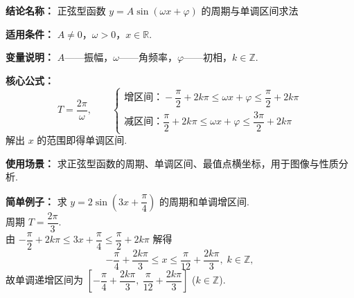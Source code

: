 \textbf{结论名称：} 正弦型函数 $y=A\sin(\omega x+\varphi)$ 的周期与单调区间求法

\textbf{适用条件：} $A\neq0$，$\omega>0$，$x\in\mathbb{R}$.

\textbf{变量说明：} $A$——振幅，$\omega$——角频率，$\varphi$——初相，$k\in\mathbb{Z}$.

\textbf{核心公式：}
\[
\boxed{T = \frac{2\pi}{\omega},\qquad 
\begin{cases}
\text{增区间：} -\dfrac{\pi}{2}+2k\pi \le \omega x+\varphi \le \dfrac{\pi}{2}+2k\pi \\[6pt]
\text{减区间：} \dfrac{\pi}{2}+2k\pi \le \omega x+\varphi \le \dfrac{3\pi}{2}+2k\pi
\end{cases}}
\]
解出 $x$ 的范围即得单调区间.

\textbf{使用场景：} 求正弦型函数的周期、单调区间、最值点横坐标，用于图像与性质分析.

\textbf{简单例子：} 求 $y=2\sin\!\left(3x+\dfrac{\pi}{4}\right)$ 的周期和单调增区间.\\
周期 $T=\dfrac{2\pi}{3}$.\\
由 $-\dfrac{\pi}{2}+2k\pi \le 3x+\dfrac{\pi}{4} \le \dfrac{\pi}{2}+2k\pi$ 解得
\[
-\frac{\pi}{4}+\frac{2k\pi}{3} \le x \le \frac{\pi}{12}+\frac{2k\pi}{3},\;k\in\mathbb{Z},
\]
故单调递增区间为 $\left[-\dfrac{\pi}{4}+\dfrac{2k\pi}{3},\ \dfrac{\pi}{12}+\dfrac{2k\pi}{3}\right]$ ($k\in\mathbb{Z}$).